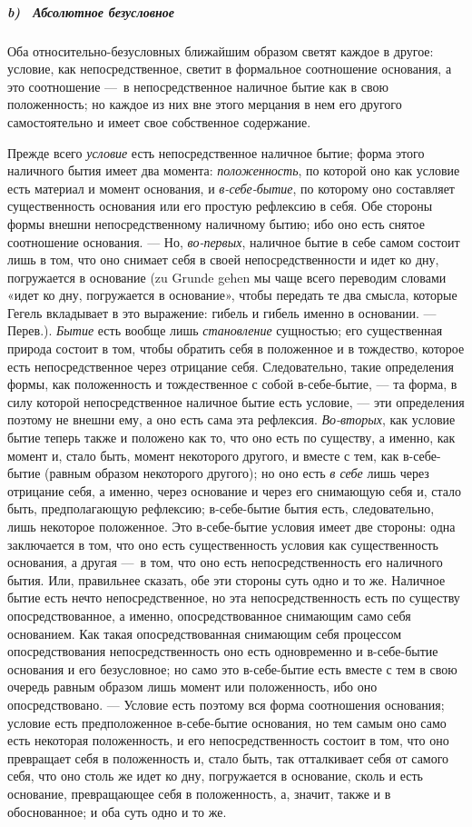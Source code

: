 \subparagraph[b) \ Абсолютное безусловное]{b) \ Абсолютное безусловное}
Оба относительно-безусловных ближайшим образом
светят каждое в другое: условие, как непосредственное, светит в формальное
соотношение основания, а это соотношение —~в непосредственное наличное
бытие как в свою положенность; но каждое из них вне этого мерцания в нем
его другого самостоятельно и имеет свое собственное содержание.

Прежде всего {\em условие} есть непосредственное
наличное бытие; форма этого наличного бытия имеет два момента:
{\em положенность}, по которой оно как условие есть
материал и момент основания, и {\em в-себе-бытие}, по
которому оно составляет существенность основания или его простую рефлексию
в себя. Обе стороны формы внешни непосредственному наличному бытию; ибо оно
есть снятое соотношение основания. — Но,
{\em во-первых}, наличное бытие в себе самом состоит
лишь в том, что оно снимает себя в своей непосредственности и идет ко дну,
погружается в основание (zu Grunde gehen мы чаще всего переводим словами
«идет ко дну, погружается в основание», чтобы передать те два смысла,
которые Гегель вкладывает в это выражение: гибель и гибель именно в
основании. — Перев.). {\em Бытие} есть вообще лишь
{\em становление} сущностью; его существенная природа
состоит в том, чтобы обратить себя в положенное и в тождество, которое есть
непосредственное через отрицание себя. Следовательно, такие определения
формы, как положенность и тождественное с собой в-себе-бытие, — та форма, в
силу которой непосредственное наличное бытие есть условие, — эти
определения поэтому не внешни ему, а оно есть сама эта рефлексия.
{\em Во-вторых}, как условие бытие теперь также и
положено как то, что оно есть по существу, а именно, как момент и, стало
быть, момент некоторого другого, и вместе с тем, как в-себе-бытие (равным
образом некоторого другого); но оно есть {\em в себе}
лишь через отрицание себя, а именно, через основание и через его снимающую
себя и, стало быть, предполагающую рефлексию; в-себе-бытие бытия есть,
следовательно, лишь некоторое положенное. Это в-себе-бытие условия имеет
две стороны: одна заключается в том, что оно есть существенность условия
как существенность основания, а другая —~в том, что оно есть
непосредственность его наличного бытия. Или, правильнее сказать, обе эти
стороны суть одно и то же. Наличное бытие есть нечто непосредственное, но
эта непосредственность есть по существу опосредствованное, а именно,
опосредствованное снимающим само себя основанием. Как такая
опосредствованная снимающим себя процессом опосредствования
непосредственность оно есть одновременно и в-себе-бытие основания и его
безусловное; но само это в-себе-бытие есть вместе с тем в свою очередь
равным образом лишь момент или положенность, ибо оно опосредствовано. —
Условие есть поэтому вся форма соотношения основания; условие есть
предположенное в-себе-бытие основания, но тем самым оно само есть некоторая
положенность, и его непосредственность состоит в том, что оно превращает
себя в положенность и, стало быть, так отталкивает себя от самого себя, что
оно столь же идет ко дну, погружается в основание, сколь и есть основание,
превращающее себя в положенность, а, значит, также и в обоснованное; и оба
суть одно и то же.

